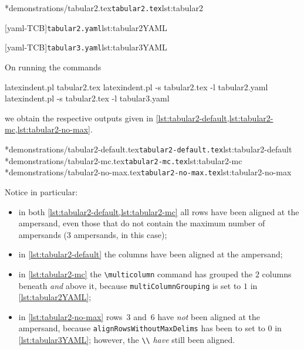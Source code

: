 	\cmhlistingsfromfile[showspaces=false,showtabs=false]*{demonstrations/tabular2.tex}{\texttt{tabular2.tex}}{lst:tabular2}
	\begin{minipage}{.45\textwidth}
		[yaml-TCB]{\texttt{tabular2.yaml}}{lst:tabular2YAML}
	\end{minipage}%
	\hfill
	\begin{minipage}{.45\textwidth}
		[yaml-TCB]{\texttt{tabular3.yaml}}{lst:tabular3YAML}
	\end{minipage}%

	On running the commands \begin{commandshell}
latexindent.pl tabular2.tex 
latexindent.pl -s tabular2.tex -l tabular2.yaml
latexindent.pl -s tabular2.tex -l tabular3.yaml
        \end{commandshell} we obtain the respective outputs given in \cref{lst:tabular2-default,lst:tabular2-mc,lst:tabular2-no-max}.

	\begin{widepage}
		\cmhlistingsfromfile[showspaces=false,showtabs=false]*{demonstrations/tabular2-default.tex}{\texttt{tabular2-default.tex}}{lst:tabular2-default}
		\cmhlistingsfromfile[showspaces=false,showtabs=false]*{demonstrations/tabular2-mc.tex}{\texttt{tabular2-mc.tex}}{lst:tabular2-mc}
		\cmhlistingsfromfile[showspaces=false,showtabs=false]*{demonstrations/tabular2-no-max.tex}{\texttt{tabular2-no-max.tex}}{lst:tabular2-no-max}
	\end{widepage}

	Notice in particular: \begin{itemize} \item in both \cref{lst:tabular2-default,lst:tabular2-mc} all rows have been aligned at the ampersand, even those that do not contain the maximum number of ampersands (3 ampersands, in this case);
		\item in \cref{lst:tabular2-default} the columns have been aligned at the ampersand;
		\item in \cref{lst:tabular2-mc} the \lstinline!\multicolumn! command has grouped the $2$ columns beneath \emph{and} above it, because \texttt{multiColumnGrouping} is set to $1$ in \cref{lst:tabular2YAML};
		\item in \cref{lst:tabular2-no-max} rows~3 and~6 have \emph{not} been aligned at the ampersand, because \texttt{alignRowsWithoutMaxDelims} has been to set to $0$ in \cref{lst:tabular3YAML}; however, the \lstinline!\\! \emph{have} still been aligned.
	\end{itemize}

